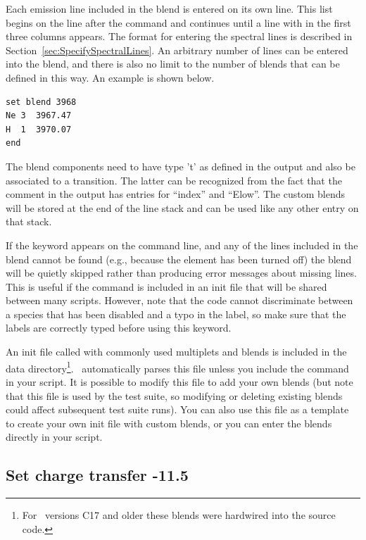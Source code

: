 Each emission line included in the blend is entered on its own line. This list
begins on the line after the  command and continues until
a line with  in the first three columns appears. The format for
entering the spectral lines is described in
Section~\ref{sec:SpecifySpectralLines}. An arbitrary number of lines can be
entered into the blend, and there is also no limit to the number of blends
that can be defined in this way. An example is shown below.
\begin{verbatim}
set blend 3968
Ne 3  3967.47
H  1  3970.07
end
\end{verbatim}

The blend components need to have type 't' as defined in the  output and also be associated to a transition. The latter can
be recognized from the fact that the comment in the  output has entries for ``index'' and ``Elow''. The custom blends
will be stored at the end of the line stack and can be used like any other entry on that
stack.

If the keyword  appears on the  command
line, and any of the lines included in the blend cannot be found (e.g.,
because the element has been turned off)
the blend will be quietly skipped rather than producing error
messages about missing lines. This is useful if the 
command is included in an init file that will be shared between many scripts.
However, note that the code cannot discriminate between a species that has
been disabled and a typo in the label, so make sure that the labels are
correctly typed before using this keyword.

An init file called  with commonly used multiplets and
blends is included in the data directory\footnote{For \Cloudy\ versions C17 and
  older these blends were hardwired into the source code.}. \Cloudy\ automatically
parses this file unless you include the  command in your
script. It is possible to modify this file to add your own blends (but note that
this file is used by the test suite, so modifying or deleting existing blends
could affect subsequent test suite runs). You can also use this file as a
template to create your own init file with custom blends, or you can enter the
blends directly in your script.

\subsection{Set charge transfer -11.5}

